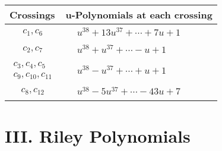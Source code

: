 \documentclass[1p]{elsarticle_modified}
\theoremstyle{definition}
\begin{document}
\begin{tabular}{m{50pt}|m{274pt}}
Crossings & \hspace{64pt}u-Polynomials at each crossing \\
\hline $$\begin{aligned}c_{1},c_{6}\end{aligned}$$&$\begin{aligned}
&u^{38}+13 u^{37}+\cdots+7 u+1
\end{aligned}$\\
\hline $$\begin{aligned}c_{2},c_{7}\end{aligned}$$&$\begin{aligned}
&u^{38}+u^{37}+\cdots- u+1
\end{aligned}$\\
\hline $$\begin{aligned}c_{3},c_{4},c_{5}\\c_{9},c_{10},c_{11}\end{aligned}$$&$\begin{aligned}
&u^{38}- u^{37}+\cdots+u+1
\end{aligned}$\\
\hline $$\begin{aligned}c_{8},c_{12}\end{aligned}$$&$\begin{aligned}
&u^{38}-5 u^{37}+\cdots-43 u+7
\end{aligned}$\\
\hline
\end{tabular}\newpage\renewcommand{\arraystretch}{1}
\centering \section*{ III. Riley Polynomials}
\end{document}
